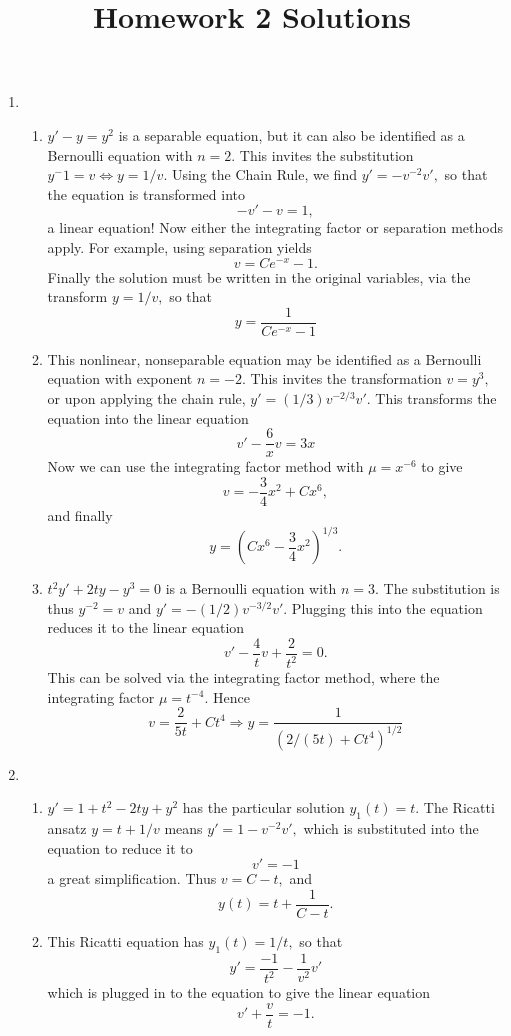 \documentclass[10pt,a4paper]{article}
\title{Homework 2 Solutions}
\date{}
\begin{document}
\maketitle
\begin{enumerate}
\item \begin{enumerate}
\item $y' - y = y^2$ is a separable equation, but it can also be identified as a Bernoulli equation with $n = 2.$ This invites the substitution $y^-1 = v \Leftrightarrow y = 1/v.$ Using the Chain Rule, we find $y' = -v^{-2} v',$ so that the equation is transformed into 
\[ -v' - v = 1,\]
a linear equation! Now either the integrating factor or separation methods apply. For example, using separation yields
\[ v= Ce^{-x} - 1. \]
Finally the solution must be written in the original variables, via the transform $y = 1/v,$ so that 
\[ y = \frac{1}{Ce^{-x} -1} \]
\item This nonlinear, nonseparable equation may be identified as a Bernoulli equation with exponent $n = -2.$ This invites the transformation $v = y^3,$ or upon applying the chain rule, $y' = (1/3) v^{-2/3} v'.$ This transforms the equation into the linear equation 
\[ v' - \frac{6}{x}v = 3x \]
Now we can use the integrating factor method with $\mu = x^{-6}$ to give 
\[ v = -\frac{3}{4}x^2 + Cx^6, \]
and finally 
\[ y = (Cx^6 - \frac{3}{4}x^2 ) ^{1/3}. \]
\item $t^2 y' + 2ty - y^3 = 0$ is a Bernoulli equation with $n = 3.$ The substitution is thus $y^{-2} = v$ and $y' = -(1/2)v^{-3/2}v'.$ Plugging this into the equation reduces it to the linear equation 
\[ v' - \frac{4}{t}v + \frac{2}{t^2} = 0. \]
This can be solved via the integrating factor method, where the integrating factor $\mu = t^{-4}.$ Hence 
\[ v = \frac{2}{5t} + Ct^4 \Rightarrow y = \frac{1}{(2/(5t) + Ct^4)^{1/2}} \]
\end{enumerate}
\item \begin{enumerate}
\item $y' = 1+t^2 - 2ty + y^2$ has the particular solution $y_1(t) = t.$ The Ricatti ansatz $y = t + 1/v$ means $y' = 1-v^{-2}v',$ which is substituted into the equation to reduce it to 
\[ v' = -1 \]
a great simplification. Thus $v = C - t,$ and 
\[ y(t) = t + \frac{1}{C-t}. \]
\item This Ricatti equation has $y_1(t) = 1/t,$ so that 
\[ y' = \frac{-1}{t^2} - \frac{1}{v^2} v' \]
which is plugged in to the equation to give the linear equation 
\[ v' + \frac{v}{t} = -1. \]

\end{enumerate}
\end{enumerate}
\end{document}
